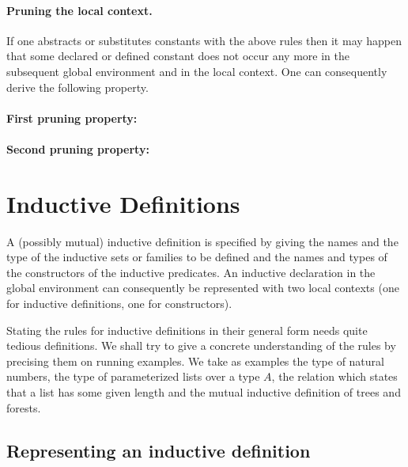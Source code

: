 \paragraph{Pruning the local context.}
If one abstracts or substitutes constants with the above rules then it
may happen that some declared or defined constant does not occur any
more in the subsequent global environment and in the local context. One can
consequently derive the following property.

\paragraph{First pruning property:}
 
\paragraph{Second pruning property:}
 
\section[Inductive Definitions]{Inductive Definitions\label{Cic-inductive-definitions}}

A (possibly mutual) inductive definition is specified by giving the
names and the type of the inductive sets or families to be
defined and the names and types of the constructors of the inductive
predicates.  An inductive declaration in the global environment can
consequently be represented with two local contexts (one for inductive
definitions, one for constructors).

Stating the rules for inductive definitions in their general form
needs quite tedious definitions. We shall try to give a concrete
understanding of the rules by precising them on running examples.  We
take as examples the type of natural numbers, the type of
parameterized lists over a type $A$, the relation which states that
a list has some given length and the mutual inductive definition of trees and
forests. 

\subsection{Representing an inductive definition}
